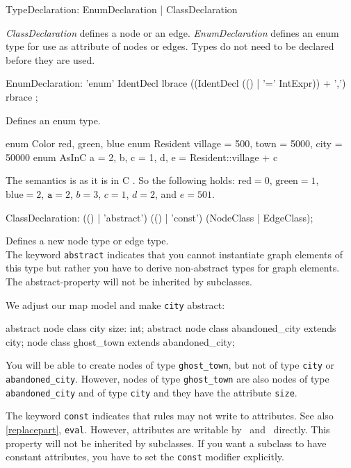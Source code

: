 \begin{rail}
  TypeDeclaration: EnumDeclaration | ClassDeclaration
\end{rail}
\emph{ClassDeclaration} defines a node or an edge. \emph{EnumDeclaration} defines an enum type for use as attribute of nodes or edges. Types do not need to be declared before they are used.

\begin{rail}
  EnumDeclaration: 'enum' IdentDecl lbrace ((IdentDecl (() | '=' IntExpr)) + ',') rbrace ;
\end{rail}
Defines an enum type.

\begin{example}
\begin{grgen}
enum Color {red, green, blue}
enum Resident {village = 500, town = 5000, city = 50000}
enum AsInC {a = 2, b, c = 1, d, e = Resident::village + c}
\end{grgen}
The semantics is as it is in C \cite{isoc}. So the following holds: $\text{red} = 0$, $\text{green} = 1$, $\text{blue} = 2$, $\texttt{a}=2$, $b=3$, $c=1$, $d=2$, and $e=501$.
\end{example}

\begin{rail}  
  ClassDeclaration: (() | 'abstract') (() | 'const') (NodeClass | EdgeClass);
\end{rail}
Defines a new node type or edge type.\\
The keyword \texttt{abstract} indicates that you cannot instantiate graph elements of this type but rather you have to derive non-abstract types for graph elements. The abstract-property will not be inherited by subclasses.

\begin{example}
We adjust our map model and make \texttt{city} abstract:
\begin{grgen}
abstract node class city {
	size: int;
}
abstract node class abandoned_city extends city;
node class ghost_town extends abandoned_city;
\end{grgen}
You will be able to create nodes of type \texttt{ghost\_town}, but not of type \texttt{city} or \texttt{abandoned\_city}. However, nodes of type \texttt{ghost\_town} are also nodes of type \texttt{abandoned\_city} and of type \texttt{city} and they have the attribute \texttt{size}.
\end{example}
The keyword \texttt{const} indicates that rules may not write to attributes. See also \ref{replacepart}, \texttt{eval}. However, attributes are writable by \LibGr\ and \GrShell\ directly. This property will not be inherited by subclasses. If you want a subclass to have constant attributes, you have to set the \texttt{const} modifier explicitly.

